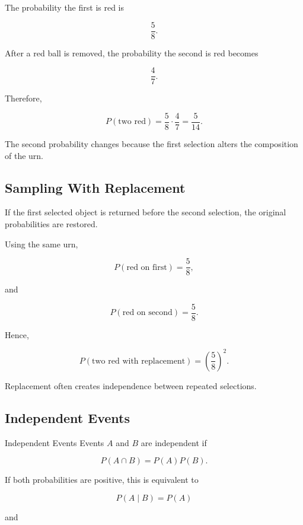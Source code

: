 The probability the first is red is

\[
\frac58.
\]

After a red ball is removed, the probability the second is red becomes

\[
\frac47.
\]

Therefore,

\[
\boxed{
P(\text{two red})
=
\frac58\cdot\frac47
=
\frac5{14}.
}
\]

The second probability changes because the first selection alters the
composition of the urn.

\subsection{Sampling With Replacement}
\label{subsec:sampling-with-replacement}

If the first selected object is returned before the second selection,
the original probabilities are restored.

Using the same urn,

\[
P(\text{red on first})
=
\frac58,
\]

and

\[
P(\text{red on second})
=
\frac58.
\]

Hence,

\[
\boxed{
P(\text{two red with replacement})
=
\left(\frac58\right)^2.
}
\]

Replacement often creates independence between repeated selections.

\subsection{Independent Events}
\label{subsec:independent-events}

\begin{definitionbox}{Independent Events}
Events \(A\) and \(B\) are independent if

\[
\boxed{
P(A\cap B)
=
P(A)P(B).
}
\]
\end{definitionbox}

If both probabilities are positive, this is equivalent to

\[
\boxed{
P(A\mid B)=P(A)
}
\]

and


